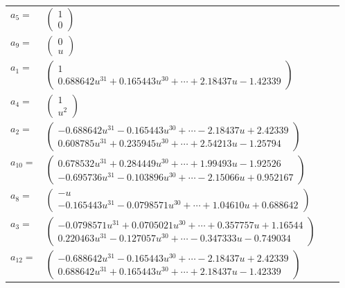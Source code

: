 \documentclass[1p]{elsarticle_modified}
\theoremstyle{definition}
\begin{document}
\begin{tabular}{m{7pt} m{180pt} m{7pt} m{180pt} }
\flushright $a_{5}=$&$\begin{pmatrix}1\\0\end{pmatrix}$ \\
\flushright $a_{9}=$&$\begin{pmatrix}0\\u\end{pmatrix}$ \\
\flushright $a_{1}=$&$\begin{pmatrix}1\\0.688642 u^{31}+0.165443 u^{30}+\cdots+2.18437 u-1.42339\end{pmatrix}$ \\
\flushright $a_{4}=$&$\begin{pmatrix}1\\u^2\end{pmatrix}$ \\
\flushright $a_{2}=$&$\begin{pmatrix}-0.688642 u^{31}-0.165443 u^{30}+\cdots-2.18437 u+2.42339\\0.608785 u^{31}+0.235945 u^{30}+\cdots+2.54213 u-1.25794\end{pmatrix}$ \\
\flushright $a_{10}=$&$\begin{pmatrix}0.678532 u^{31}+0.284449 u^{30}+\cdots+1.99493 u-1.92526\\-0.695736 u^{31}-0.103896 u^{30}+\cdots-2.15066 u+0.952167\end{pmatrix}$ \\
\flushright $a_{8}=$&$\begin{pmatrix}- u\\-0.165443 u^{31}-0.0798571 u^{30}+\cdots+1.04610 u+0.688642\end{pmatrix}$ \\
\flushright $a_{3}=$&$\begin{pmatrix}-0.0798571 u^{31}+0.0705021 u^{30}+\cdots+0.357757 u+1.16544\\0.220463 u^{31}-0.127057 u^{30}+\cdots-0.347333 u-0.749034\end{pmatrix}$ \\
\flushright $a_{12}=$&$\begin{pmatrix}-0.688642 u^{31}-0.165443 u^{30}+\cdots-2.18437 u+2.42339\\0.688642 u^{31}+0.165443 u^{30}+\cdots+2.18437 u-1.42339\end{pmatrix}$ \\

\end{tabular}
\end{document}
